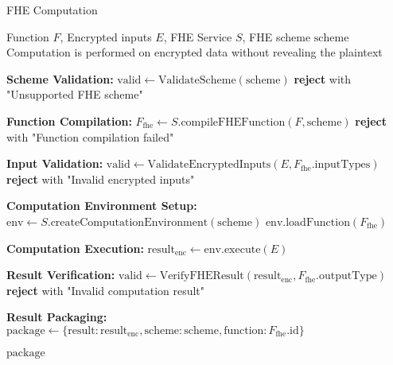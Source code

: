 \begin{tcolorbox}[
    enhanced,
    colback=blue!5!white,
    colframe=blue!75!black,
    arc=5mm,
    boxrule=1.5pt,
    title=FHE Computation Protocol,
    fonttitle=\bfseries,
    coltitle=white,
    attach boxed title to top left={yshift=-2mm, xshift=5mm},
    boxed title style={colback=blue!75!black, rounded corners},
    shadow={2mm}{-2mm}{0mm}{black!50},
    drop fuzzy shadow
]
\begin{protocol}{FHE Computation}
\label{prot:fhe-computation}
\begin{algorithmic}[1]
\Require Function $F$, Encrypted inputs $E$, FHE Service $S$, FHE scheme $\text{scheme}$
\Ensure Computation is performed on encrypted data without revealing the plaintext

\State \textbf{Scheme Validation:}
\State $\text{valid} \gets \text{ValidateScheme}(\text{scheme})$
    \State \textbf{reject} with "Unsupported FHE scheme"
\EndIf

\State \textbf{Function Compilation:}
\State $F_{\text{fhe}} \gets S.\text{compileFHEFunction}(F, \text{scheme})$
    \State \textbf{reject} with "Function compilation failed"
\EndIf

\State \textbf{Input Validation:}
\State $\text{valid} \gets \text{ValidateEncryptedInputs}(E, F_{\text{fhe}}.\text{inputTypes})$
    \State \textbf{reject} with "Invalid encrypted inputs"
\EndIf

\State \textbf{Computation Environment Setup:}
\State $\text{env} \gets S.\text{createComputationEnvironment}(\text{scheme})$
\State $\text{env}.\text{loadFunction}(F_{\text{fhe}})$

\State \textbf{Computation Execution:}
\State $\text{result}_{\text{enc}} \gets \text{env}.\text{execute}(E)$

\State \textbf{Result Verification:}
\State $\text{valid} \gets \text{VerifyFHEResult}(\text{result}_{\text{enc}}, F_{\text{fhe}}.\text{outputType})$
    \State \textbf{reject} with "Invalid computation result"
\EndIf

\State \textbf{Result Packaging:}
\State $\text{package} \gets \{\text{result}: \text{result}_{\text{enc}}, \text{scheme}: \text{scheme}, \text{function}: F_{\text{fhe}}.\text{id}\}$

\State \Return $\text{package}$
\end{algorithmic}
\end{protocol}
\end{tcolorbox}

